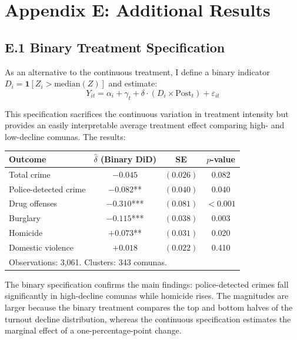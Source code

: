 \documentclass[12pt]{article}
\begin{document}
\setcounter{table}{0}
\setcounter{figure}{0}
\section*{Appendix E: Additional Results}

\subsection*{E.1 Binary Treatment Specification}

As an alternative to the continuous treatment, I define a binary indicator $D_i = \mathbf{1}[Z_i > \text{median}(Z)]$ and estimate:
\begin{equation}
Y_{it} = \alpha_i + \gamma_t + \delta \cdot (D_i \times \text{Post}_t) + \varepsilon_{it}
\end{equation}

This specification sacrifices the continuous variation in treatment intensity but provides an easily interpretable average treatment effect comparing high- and low-decline comunas. The results:

\begin{center}
\begin{tabular}{lccc}
\toprule
Outcome & $\hat{\delta}$ (Binary DiD) & SE & $p$-value \\
\midrule
Total crime           & $-0.045$ & $(0.026)$ & 0.082 \\
Police-detected crime & $-0.082$** & $(0.040)$ & 0.040 \\
Drug offenses         & $-0.310$*** & $(0.081)$ & $<0.001$ \\
Burglary              & $-0.115$*** & $(0.038)$ & 0.003 \\
Homicide              & $+0.073$** & $(0.031)$ & 0.020 \\
Domestic violence     & $+0.018$ & $(0.022)$ & 0.410 \\
\midrule
\multicolumn{4}{l}{Observations: 3,061. Clusters: 343 comunas.} \\
\bottomrule
\end{tabular}
\end{center}

The binary specification confirms the main findings: police-detected crimes fall significantly in high-decline comunas while homicide rises. The magnitudes are larger because the binary treatment compares the top and bottom halves of the turnout decline distribution, whereas the continuous specification estimates the marginal effect of a one-percentage-point change.
\end{document}
